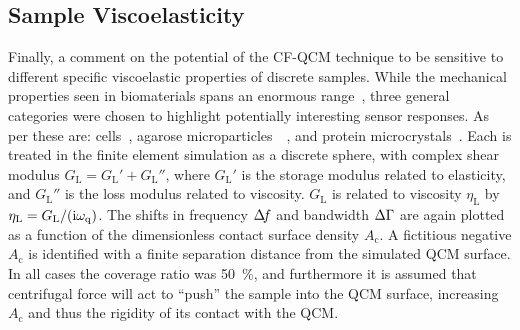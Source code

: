 \subsection{Sample Viscoelasticity}
\label{sec:sampleviscoelasticity}
Finally, a comment on the potential of the CF-QCM technique to be
sensitive to different specific viscoelastic properties of discrete samples.  While
the mechanical properties seen in biomaterials spans an enormous
range~\cite{meyers2008biological}, three general categories were chosen to
highlight potentially interesting sensor responses.  As per
 these are: cells~\cite{li2008thickness}, agarose
microparticles~\cite{li2011surface}~\cite{patra2009viscoelastic}, and
protein microcrystals~\cite{zamiri2009modeling}.  Each is treated in the
finite element simulation as a discrete sphere, with complex shear modulus
$G_\mathrm{L}=G_\mathrm{L}'+G_\mathrm{L}''$, where $G_\mathrm{L}'$ is the
storage modulus related to elasticity, and $G_\mathrm{L}''$ is the loss
modulus related to viscosity.  $G_\mathrm{L}$ is related to viscosity
$\eta_\mathrm{L}$ by $\eta_\mathrm{L}=G_\mathrm{L}/({\mathrm{i}}\omega_\mathrm{q})$.  The
shifts in frequency $\Delta\!f$ and bandwidth $\Delta\Gamma$ are again plotted as a function of
the dimensionless contact surface density $A_\mathrm{c}$.
A fictitious negative $A_\mathrm{c}$
is identified with a finite separation distance from the
simulated QCM surface.  In all cases the coverage ratio was
\SI{50}{\percent}, and furthermore it is assumed that centrifugal force will act to
``push'' the sample into the QCM surface, increasing $A_\mathrm{c}$ and
thus the rigidity of its contact with the QCM.
